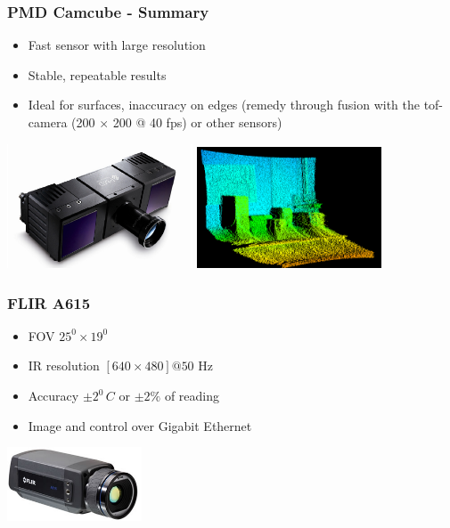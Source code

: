 \begin{frame}
 \frametitle{PMD Camcube - Summary}
\begin{itemize}
  \item Fast sensor with large resolution
  \item Stable, repeatable results
  \item Ideal for surfaces, inaccuracy on edges (remedy through fusion with the tof-camera (200 $\times$ 200 @ 40 fps) or other sensors)
\end{itemize}
\hspace{3ex}\includegraphics[width=5.5cm]{images/camcube.png}
\includegraphics[width=5.5cm]{images/pmd2.png}
\end{frame}


\begin{frame}
 \frametitle{FLIR A615}
\begin{itemize}
  \item FOV $25^0 \times 19^0$
  \item IR resolution $[640 \times 480]@50$ Hz
  \item Accuracy $\pm 2^0\,C$ or $\pm 2\%$ of reading
  \item Image and control over Gigabit Ethernet
\end{itemize}

\vspace{5ex}\hspace{37ex}\includegraphics[width=4cm]{images/A615_300.jpg}
\end{frame}

